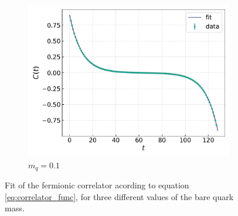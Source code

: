 \begin{figure}[h!]
\begin{subfigure}[b]{0.68\textwidth}
        \includegraphics[width=1.05\textwidth]{figures/correlator/corrs_free/corr_medium.pdf}
        \caption{$m_q = 0.1$}        
    \end{subfigure}
    \caption[Fit of the correlator for free Wilson fermions.]{Fit of the fermionic correlator acording to equation \eqref{eq:correlator_func}, for three different values of the bare quark mass.}
    \label{fig:fit_wilson}
\end{figure}

\newpage

